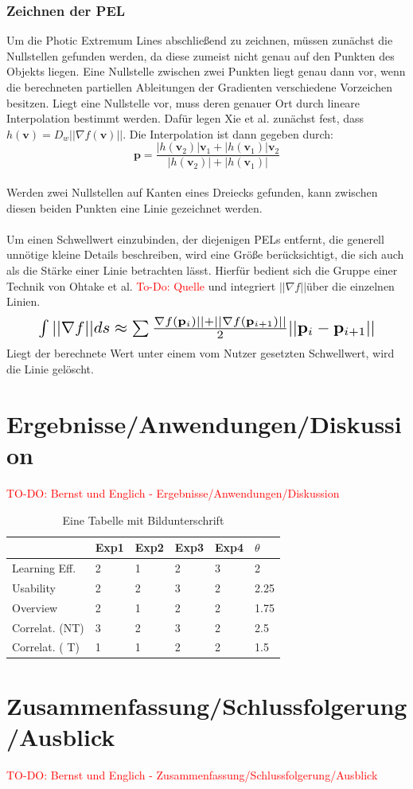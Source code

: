 \documentclass{paperStyle}
\newcommand\todo[1]{\textcolor{red}{#1}}
\begin{document}
\subsubsection{Zeichnen der PEL}
\label{zeichnen}
Um die Photic Extremum Lines abschließend zu zeichnen, müssen zunächst die Nullstellen gefunden werden, da diese zumeist nicht genau auf den Punkten des Objekts liegen. Eine Nullstelle zwischen zwei Punkten liegt genau dann vor, wenn die berechneten partiellen Ableitungen der Gradienten verschiedene Vorzeichen besitzen. Liegt eine Nullstelle vor, muss deren genauer Ort durch lineare Interpolation bestimmt werden. Dafür legen Xie et al. zunächst fest, dass $h(\mathbf{v}) = D_{w}|| \nabla f(\mathbf{v})||$. Die Interpolation ist dann gegeben durch:
\begin{equation}
\mathbf{p} = \frac{|h(\mathbf{v}_{2})|\mathbf{v}_{1}+|h(\mathbf{v}_{1})|\mathbf{v}_{2}}{|h(\mathbf{v}_{2})|+|h(\mathbf{v}_{1})|}
\end{equation}
\\
Werden zwei Nullstellen auf Kanten eines Dreiecks gefunden, kann zwischen diesen beiden Punkten eine Linie gezeichnet werden.
\\\\
Um einen Schwellwert einzubinden, der diejenigen PELs entfernt, die generell unnötige kleine Details beschreiben, wird eine Größe berücksichtigt, die sich auch als die Stärke einer Linie betrachten lässt. Hierfür bedient sich die Gruppe einer Technik von Ohtake et al. \todo{To-Do: Quelle} und integriert $|| \nabla f ||$über die einzelnen Linien. 
\begin{equation}
\resizebox{.88\hsize}{!}{$\int{} || \nabla f ||ds \approx \sum \frac{ \nabla f(\mathbf{p}_{i})|| + || \nabla f(\mathbf{p}_{i+1})||}{2}||\mathbf{p}_{i} - \mathbf{p}_{i+1}||$}
\end{equation}
Liegt der berechnete Wert unter einem vom Nutzer gesetzten Schwellwert, wird die Linie gelöscht.
\section{Ergebnisse/Anwendungen/Diskussion}
\todo{TO-DO: Bernst und Englich - Ergebnisse/Anwendungen/Diskussion}

\begin{table}[htb]

\begin{tabular}{|l|lllll|}
\hline
 & Exp1 & Exp2 & Exp3 & Exp4 &$\theta$\\
\hline
Learning Eff. & 2 & 1 & 2 &3 & 2 \\
Usability & 2 & 2 & 3 &2 & 2.25 \\
Overview & 2 & 1 & 2 &2 & 1.75 \\
Correlat. (NT) & 3 & 2 & 3 &2 & 2.5 \\
Correlat. ( T) & 1 & 1 & 2 &2 & 1.5 \\

\hline
\end{tabular}
\caption{Eine Tabelle mit Bildunterschrift }
\label{tab:TableExample}
\end{table}

\section{Zusammenfassung/Schlussfolgerung/Ausblick}
\todo{TO-DO: Bernst und Englich - Zusammenfassung/Schlussfolgerung/Ausblick}




\end{document}
